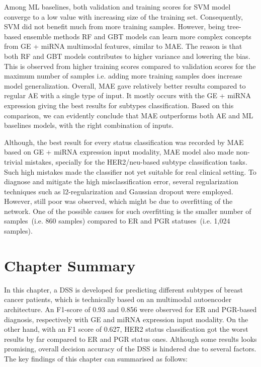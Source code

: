 \hspace*{3.5mm} Among ML baselines, both validation and training scores for SVM model converge to a low value with increasing size of the training set. Consequently, SVM did not benefit much from more training samples. However, being tree-based ensemble methods RF and GBT models can learn more complex concepts from GE + miRNA multimodal features, similar to MAE. The reason is that both RF and GBT models contributes to higher variance and lowering the bias. This is observed from higher training scores compared to validation scores for the maximum number of samples i.e. adding more training samples does increase model generalization. Overall, MAE gave relatively better results compared to regular AE with a single type of input. 
It mostly occurs with the GE + miRNA expression giving the best results for subtypes classification.
Based on this comparison, we can evidently conclude that MAE outperforms both AE and ML baselines models, with the right combination of inputs.

\hspace*{3.5mm} Although, the best result for every status classification was recorded by MAE based on GE + miRNA expression input modality, MAE model also made non-trivial mistakes, specially for the HER2/neu-based subtype classification tasks. Such high mistakes made the classifier not yet suitable for real clinical setting. To diagnose and mitigate the high misclassification error, several regularization techniques such as l2-regularization and Gaussian dropout were employed. However, still poor was observed, which might be due to overfitting of the network. One of the possible causes for such overfitting is the smaller number of samples~(i.e. 860 samples) compared to ER and PGR statuses~(i.e. 1,024 samples). 

\section{Chapter Summary}\label{chapter_4:conclusion}
In this chapter, a DSS is developed for predicting different subtypes of breast cancer patients, which is technically based on an multimodal autoencoder architecture. An F1-score of 0.93 and 0.856 were observed for ER and PGR-based diagnosis, respectively with GE and miRNA expression input modality. On the other hand, with an F1 score of 0.627, HER2 status classification got the worst results by far compared to ER and PGR status ones. Although some results looks promising, overall decision accuracy of the DSS is hindered due to several factors. The key findings of this chapter can summarised as follows: 

